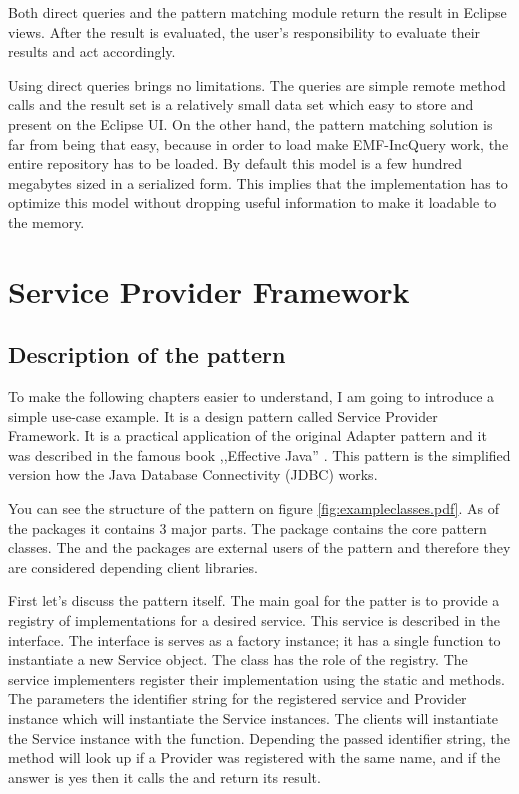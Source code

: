 Both direct queries and the pattern matching module return the result in Eclipse 
views. After the result is evaluated, the user's responsibility to evaluate their
results and act accordingly.

Using direct queries brings no limitations. The queries are simple remote method
calls and the result set is a relatively small data set which easy to store and
present on the Eclipse UI. On the other hand, the pattern matching solution is
far from being that easy, because in order to load make EMF-IncQuery work, the
entire repository has to be loaded. By default this model is a few hundred
megabytes sized in a serialized form. This implies that the implementation has to 
optimize this model without dropping useful information to make it loadable to 
the memory.

\section{Service Provider Framework}

\subsection{Description of the pattern}

To make the following chapters easier to understand, I am going to introduce a
simple use-case example. It is a design pattern called Service Provider
Framework. It is a practical application of the original Adapter pattern and it
was described in the famous book ,,Effective Java'' \cite{Bloch08}. This pattern
is the simplified version how the Java Database Connectivity (JDBC) works.


You can see the structure of the pattern on figure
\autoref{fig:exampleclasses.pdf}. As of the packages it contains 3 major parts.
The  package contains the core pattern classes. The 
and the  packages are external users of the pattern and therefore
they are considered depending client libraries.

First let's discuss the pattern itself. The main goal for the patter is to
provide a registry of implementations for a desired service. This service is
described in the  interface. The  interface is
serves as a factory instance; it has a single function to instantiate a new
Service object. The  class has the role of the registry.
The service implementers register their implementation using the static
 and  methods. The
parameters the identifier string for the registered service and Provider
instance which will instantiate the Service instances. The clients will
instantiate the Service instance with the  function.
Depending the passed identifier string, the method will look up if a Provider
was registered with the same name, and if the answer is yes then it calls the
 and return its result.

